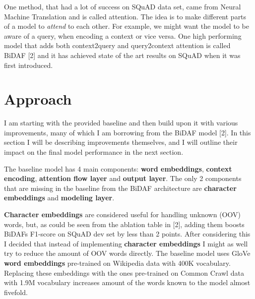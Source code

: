 \documentclass{article}
\begin{document}
  One method, that had a lot of success on SQuAD data set, came from Neural Machine Translation and is called attention. The idea is to make different parts of a model to {\it attend} to each other. For example, we might want the model to be aware of a query, when encoding a context or vice versa. One high performing model that adds both context2query and query2context attention is called BiDAF [2] and it has achieved state of the art results on SQuAD when it was first introduced. 

\section{Approach}
I am starting with the provided baseline and then build upon it with various improvements, many of which I am borrowing from the BiDAF model [2]. In this section I will be describing improvements themselves, and I will outline their impact on the final model performance in the next section.

The baseline model has 4 main components: {\bf word embeddings}, {\bf context encoding}, {\bf attention flow layer} and {\bf output layer}. The only 2 components that are missing in the baseline from the BiDAF architecture are {\bf character embeddings} and {\bf modeling layer}.

{\bf Character embeddings} are considered useful for handling unknown (OOV) words, but, as could be seen from the ablation table in [2], adding them boosts BiDAFs F1-score on SQuAD dev set by less than 2 points. After considering this I decided that instead of implementing {\bf character embeddings} I might as well try to reduce the amount of OOV words directly. The baseline model uses GloVe {\bf word embeddings} pre-trained on Wikipedia data with 400K vocabulary. Replacing these embeddings with the ones pre-trained on Common Crawl data with 1.9M vocabulary increases amount of the words known to the model almost fivefold.
\end{document}
